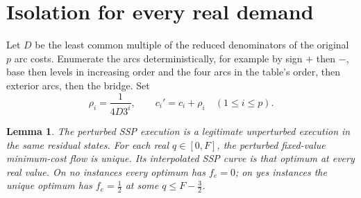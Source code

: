 \documentclass[11pt]{article}
\newtheorem{lemma}[theorem]{Lemma}
\theoremstyle{remark}\newtheorem{remark}[theorem]{Remark}
\begin{document}
\section{Isolation for every real demand}
Let $D$ be the least common multiple of the reduced denominators of the original $p$ arc costs. Enumerate the arcs deterministically, for example by sign $+$ then $-$, base then levels in increasing order and the four arcs in the table's order, then exterior arcs, then the bridge. Set
\[
 \rho_i=\frac1{4D3^i},\qquad c_i'=c_i+\rho_i\quad(1\le i\le p).
\]
\begin{lemma}\label{lem:isolate}
The perturbed SSP execution is a legitimate unperturbed execution in the same residual states. For each real $q\in[0,F]$, the perturbed fixed-value minimum-cost flow is unique. Its interpolated SSP curve is that optimum at every real value. On no instances every optimum has $f_e=0$; on yes instances the unique optimum has $f_e=\tfrac12$ at some $q\le F-\tfrac32$.
\end{lemma}
\end{document}
